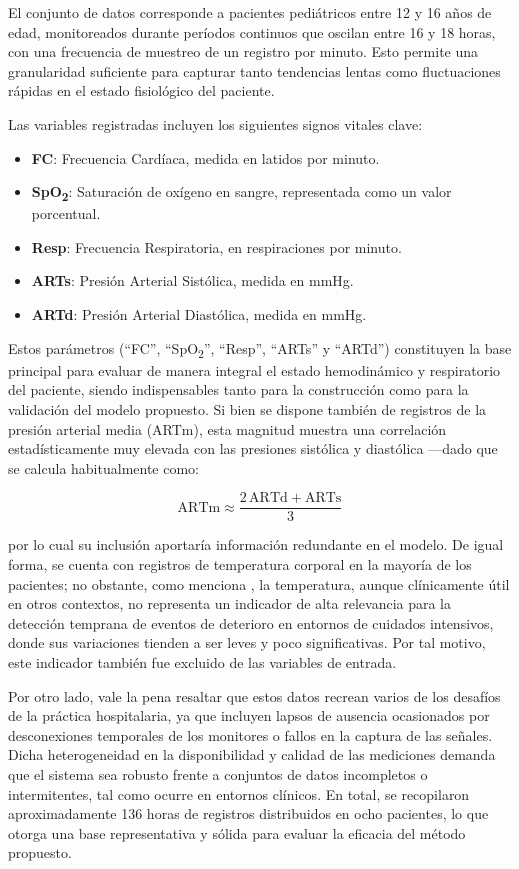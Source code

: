 El conjunto de datos corresponde a pacientes pediátricos entre 12 y 16 años de edad, monitoreados durante períodos continuos que oscilan entre 16 y 18 horas, con una frecuencia de muestreo de un registro por minuto. Esto permite una granularidad suficiente para capturar tanto tendencias lentas como fluctuaciones rápidas en el estado fisiológico del paciente.

Las variables registradas incluyen los siguientes signos vitales clave:

\begin{itemize}
  \item \textbf{FC}: Frecuencia Cardíaca, medida en latidos por minuto.
  \item \textbf{SpO\textsubscript{2}}: Saturación de oxígeno en sangre, representada como un valor porcentual.
  \item \textbf{Resp}: Frecuencia Respiratoria, en respiraciones por minuto.
  \item \textbf{ARTs}: Presión Arterial Sistólica, medida en mmHg.
  \item \textbf{ARTd}: Presión Arterial Diastólica, medida en mmHg.
\end{itemize}

Estos parámetros (“FC”, “SpO\textsubscript{2}”, “Resp”, “ARTs” y “ARTd”) constituyen la base principal para evaluar de manera integral el estado hemodinámico y respiratorio del paciente, siendo indispensables tanto para la construcción como para la validación del modelo propuesto. Si bien se dispone también de registros de la presión arterial media (ARTm), esta magnitud muestra una correlación estadísticamente muy elevada con las presiones sistólica y diastólica —dado que se calcula habitualmente como:

\[
  \mathrm{ARTm} \approx \frac{2\,\mathrm{ARTd} + \mathrm{ARTs}}{3}
\]

por lo cual su inclusión aportaría información redundante en el modelo. De igual forma, se cuenta con registros de temperatura corporal en la mayoría de los pacientes; no obstante, como menciona \textcite{Vargas2023}, la temperatura, aunque clínicamente útil en otros contextos, no representa un indicador de alta relevancia para la detección temprana de eventos de deterioro en entornos de cuidados intensivos, donde sus variaciones tienden a ser leves y poco significativas. Por tal motivo, este indicador también fue excluido de las variables de entrada.

Por otro lado, vale la pena resaltar que estos datos recrean varios de los desafíos de la práctica hospitalaria, ya que incluyen lapsos de ausencia ocasionados por desconexiones temporales de los monitores o fallos en la captura de las señales. Dicha heterogeneidad en la disponibilidad y calidad de las mediciones demanda que el sistema sea robusto frente a conjuntos de datos incompletos o intermitentes, tal como ocurre en entornos clínicos. En total, se recopilaron aproximadamente 136 horas de registros distribuidos en ocho pacientes, lo que otorga una base representativa y sólida para evaluar la eficacia del método propuesto.

